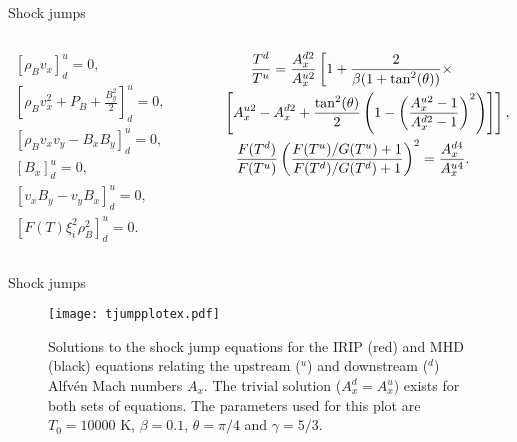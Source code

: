 \documentclass[10pt,aspectratio=169,usenames,dvipsnames]{beamer}
\begin{document}
\begin{frame}{Shock jumps}
\begin{columns}
\begin{column}{0.45\textwidth}
\begin{gather}
    \left[\rho_B v_x  \right]^u _d = 0, \label{eqn:iripjump1} \\
    \left[\rho_B v_x^2 +P_B +\frac{B_y^2}{2} \right]^u _d = 0, \\
    \left[\rho_B v_x v_y -B_x B_y \right]^u _d = 0, \\
    \left[B_x \right]^u _d = 0, \\
    \left[v_x B_y -v_y B_x   \right]^u _d = 0, \label{eqn:iripjump2} \\
    \left[ F(T) \xi_i^2 \rho_B^2 \right]^u _d=0.
\end{gather}
\end{column}
\begin{column}{0.55\textwidth}
\begin{gather}
    \frac{T^d}{T^u} = \frac{A_x^{d2}}{A_x^{u2}} \left[1 + \frac{2}{\beta (1+ \tan ^2 (\theta))} \times \nonumber \right. \\ \left. \hspace{0.7cm} \left[ A_x^{u2}-A_x^{d2} + \frac{\tan ^2 (\theta)}{2} \left(1 - \left(\frac{A_x^{u2}-1}{A_x^{d2}-1}\right)^2\right)  \right] \right], \label{eqn:irtjump} \\
    \frac{F(T ^d)}{F(T^u)} \left( \frac{F(T^u)/G(T^u) +1}{F(T^d)/G(T^d) +1} \right)^2= \frac{A_x^{d4}}{A_x^{u4}}. \label{eqn:ftjump}
\end{gather}
\end{column}
\end{columns}
\end{frame}

\begin{frame}{Shock jumps}
\begin{figure}
    \centering
\texttt{[image: tjumpplotex.pdf]}
    \caption{Solutions to the shock jump equations for the IRIP (red) and MHD (black) equations relating the upstream ($^u$) and downstream ($^d$) Alfv\'en Mach numbers $A_x$. The trivial solution ($A_x^{d}=A_x^{u}$) exists for both sets of equations. The parameters used for this plot are $T_0 = 10000$ K, $\beta = 0.1$, $\theta =\pi/4$ and $\gamma =5/3$.}
    \label{fig:tjumpex}
\end{figure}
\end{frame}
\end{document}
